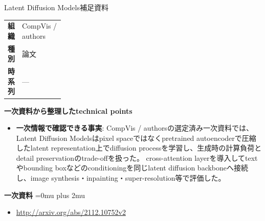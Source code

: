 \begin{technicalnote}{Latent Diffusion Models}{補足資料}
\begingroup
\begin{tabularx}{\linewidth}{@{}>{\bfseries}p{0.22\linewidth}X@{}}
組織 & CompVis / authors \\
種別 & 論文 \\
時系列 & — \\
\end{tabularx}
\smallskip
{\bfseries 一次資料から整理したtechnical points}
\begin{itemize}[leftmargin=1.5em,itemsep=0.35em]
\item \textbf{一次情報で確認できる事実}: CompVis / authorsの選定済み一次資料では、Latent Diffusion Modelsはpixel spaceではなくpretrained autoencoderで圧縮したlatent representation上でdiffusion processを学習し、生成時の計算負荷とdetail preservationのtrade-offを扱った。 cross-attention layerを導入してtextやbounding boxなどのconditioningを同じlatent diffusion backboneへ接続し、image synthesis・inpainting・super-resolution等で評価した。
\end{itemize}
\begin{minipage}{\linewidth}
\begin{samepage}
{\bfseries 一次資料}
\begingroup\sloppy
\Urlmuskip=0mu plus 2mu\relax
\begin{itemize}[leftmargin=1.5em,itemsep=0.25em]
\item {\scriptsize\url{http://arxiv.org/abs/2112.10752v2}}
\end{itemize}
\endgroup
\end{samepage}
\end{minipage}
\endgroup
\end{technicalnote}
\medskip

